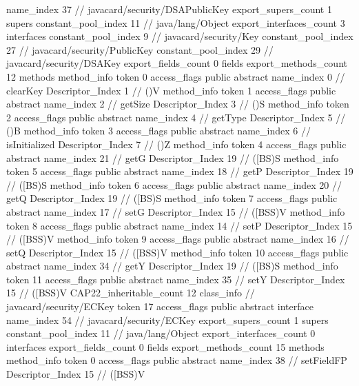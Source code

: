 {{{			name_index	37		// javacard/security/DSAPublicKey
			export_supers_count	1
			supers {
				constant_pool_index	11		// java/lang/Object
			}
			export_interfaces_count	3
			interfaces {
				constant_pool_index	9		// javacard/security/Key
				constant_pool_index	27		// javacard/security/PublicKey
				constant_pool_index	29		// javacard/security/DSAKey
			}
			export_fields_count	0
			fields {
			}
			export_methods_count	12
			methods {
				method_info {
					token	0
					access_flags	public abstract
					name_index	0		// clearKey
					Descriptor_Index	1		// ()V
				}
				method_info {
					token	1
					access_flags	public abstract
					name_index	2		// getSize
					Descriptor_Index	3		// ()S
				}
				method_info {
					token	2
					access_flags	public abstract
					name_index	4		// getType
					Descriptor_Index	5		// ()B
				}
				method_info {
					token	3
					access_flags	public abstract
					name_index	6		// isInitialized
					Descriptor_Index	7		// ()Z
				}
				method_info {
					token	4
					access_flags	public abstract
					name_index	21		// getG
					Descriptor_Index	19		// ([BS)S
				}
				method_info {
					token	5
					access_flags	public abstract
					name_index	18		// getP
					Descriptor_Index	19		// ([BS)S
				}
				method_info {
					token	6
					access_flags	public abstract
					name_index	20		// getQ
					Descriptor_Index	19		// ([BS)S
				}
				method_info {
					token	7
					access_flags	public abstract
					name_index	17		// setG
					Descriptor_Index	15		// ([BSS)V
				}
				method_info {
					token	8
					access_flags	public abstract
					name_index	14		// setP
					Descriptor_Index	15		// ([BSS)V
				}
				method_info {
					token	9
					access_flags	public abstract
					name_index	16		// setQ
					Descriptor_Index	15		// ([BSS)V
				}
				method_info {
					token	10
					access_flags	public abstract
					name_index	34		// getY
					Descriptor_Index	19		// ([BS)S
				}
				method_info {
					token	11
					access_flags	public abstract
					name_index	35		// setY
					Descriptor_Index	15		// ([BSS)V
				}
			}
			CAP22_inheritable_count	12
		}
		class_info {		// javacard/security/ECKey
			token	17
			access_flags	public abstract interface
			name_index	54		// javacard/security/ECKey
			export_supers_count	1
			supers {
				constant_pool_index	11		// java/lang/Object
			}
			export_interfaces_count	0
			interfaces {
			}
			export_fields_count	0
			fields {
			}
			export_methods_count	15
			methods {
				method_info {
					token	0
					access_flags	public abstract
					name_index	38		// setFieldFP
					Descriptor_Index	15		// ([BSS)V
}}}}}
